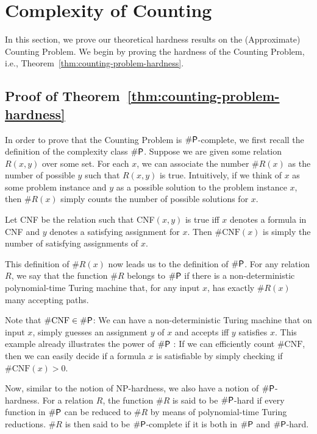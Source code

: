 \section{Complexity of Counting} \label{theory}

In this section, we prove our theoretical hardness results on the (Approximate) Counting Problem. We begin by proving the hardness of the Counting Problem, i.e., Theorem~\ref{thm:counting-problem-hardness}.

\subsection{Proof of Theorem~\ref{thm:counting-problem-hardness}} \label{theory:A}

In order to prove that the Counting Problem is $\#\mathsf{P}$-complete, we first recall
the definition of the complexity class $\#\mathsf{P}$. Suppose we are given some relation $R(x,y)$ over some set. For each $x$, we can associate the number $\#R(x)$ as the number
of possible $y$ such that $R(x,y)$ is true. Intuitively, if we think of $x$ as some problem instance and $y$ as a possible solution to the problem instance $x$, then 
$\#R(x)$ simply counts the number of possible solutions for $x$.

\begin{example}
    Let CNF be the relation such that CNF$(x,y)$ is true iff $x$ denotes a formula in CNF
    and $y$ denotes a satisfying assignment for $x$. Then $\#\text{CNF}(x)$ is simply the number
    of satisfying assignments of $x$.
\end{example}

This definition of $\#R(x)$ now leads us to the definition of $\#\mathsf{P}$.
For any relation $R$, we say that the function $\#R$ belongs to $\#\mathsf{P}$ if there is a non-deterministic polynomial-time Turing machine that, for any input $x$, has exactly $\#R(x)$ many accepting paths.

\begin{example}
    Note that $\#\text{CNF} \in \#\mathsf{P}$: We can have a non-deterministic Turing machine 
    that on input $x$, simply guesses an assignment $y$ of $x$ and accepts iff $y$ satisfies $x$. This example already illustrates the power of $\#\mathsf{P}$ : If we can efficiently count $\#\text{CNF}$, then we can easily decide if a formula $x$ is satisfiable
    by simply checking if $\#\text{CNF}(x) > 0$. 
\end{example}

Now, similar to the notion of NP-hardness, we also have a notion of $\#\mathsf{P}$-hardness.
For a relation $R$, the function $\#R$ is said to be $\#\mathsf{P}$-hard if every 
function in $\#\mathsf{P}$ can be reduced to $\#R$ by means of polynomial-time Turing reductions. $\#R$ is then said to be $\#\mathsf{P}$-complete if it is both in $\#\mathsf{P}$
and $\#\mathsf{P}$-hard.

